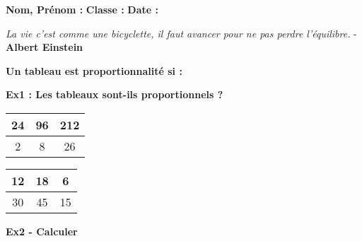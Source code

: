 



\textbf{Nom, Prénom :} \hspace{8cm} \textbf{Classe :} \hspace{3cm} \textbf{Date :}\\

\begin{center}
  \textit{La vie c’est comme une bicyclette, il faut avancer pour ne pas perdre l’équilibre.} - \textbf{Albert Einstein}
\end{center}


\textbf{Un tableau est proportionnalité si : }\dotfill \\ \Pointilles[2] 

\textbf{Ex1 : Les tableaux sont-ils proportionnels ?}


\begin{multicols}{2}\noindent
  \begin{center}\begin{tabular}{|c|c|c|} \hline
    24 & 96 & 212 \\  \hline
    2 & 8 & 26\\  \hline
  \end{tabular}\end{center}

  \Pointilles[5]  \columnbreak 

  \begin{center}\begin{tabular}{|c|c|c|} \hline
    12 & 18 & 6 \\  \hline
    30 & 45 & 15\\  \hline
  \end{tabular}\end{center}

  \Pointilles[5] 

\end{multicols}

\textbf{Ex2 - Calculer}

